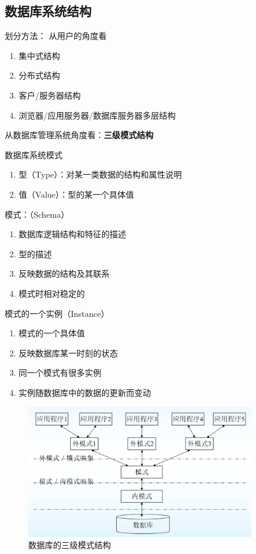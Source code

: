 \documentclass{article}
\begin{document}
\subsection{数据库系统结构}

划分方法：
从用户的角度看
\begin{enumerate}
    \item 集中式结构
    \item 分布式结构
    \item 客户/服务器结构
    \item 浏览器/应用服务器/数据库服务器多层结构
\end{enumerate}

从数据库管理系统角度看：\textbf{三级模式结构}

数据库系统模式

\begin{enumerate}
    \item 型（Type）：对某一类数据的结构和属性说明
    \item 值（Value）：型的某一个具体值
\end{enumerate}

模式：（Schema）
\begin{enumerate}
    \item 数据库逻辑结构和特征的描述
    \item 型的描述
    \item 反映数据的结构及其联系
    \item 模式时相对稳定的
\end{enumerate}

模式的一个实例（Instance）
\begin{enumerate}
    \item 模式的一个具体值
    \item 反映数据库某一时刻的状态
    \item 同一个模式有很多实例
    \item 实例随数据库中的数据的更新而变动
\end{enumerate}

\begin{figure}
    \centering
    \includegraphics[width=10cm]{img/1.3-1.png}
    \caption{数据库的三级模式结构}
\end{figure}
\end{document}
